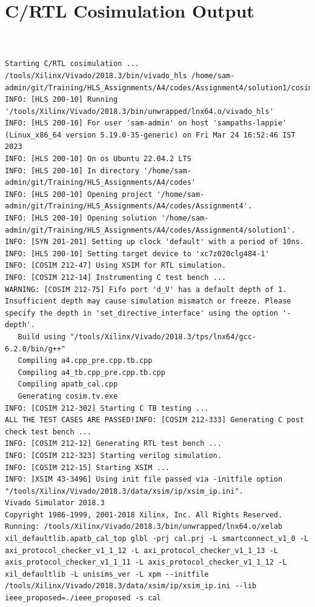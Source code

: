 \documentclass{article}
\begin{document}
\section{C/RTL Cosimulation Output}
\vspace{1cm}
\begin{lstlisting}


Starting C/RTL cosimulation ...
/tools/Xilinx/Vivado/2018.3/bin/vivado_hls /home/sam-admin/git/Training/HLS_Assignments/A4/codes/Assignment4/solution1/cosim.tcl
INFO: [HLS 200-10] Running '/tools/Xilinx/Vivado/2018.3/bin/unwrapped/lnx64.o/vivado_hls'
INFO: [HLS 200-10] For user 'sam-admin' on host 'sampaths-lappie' (Linux_x86_64 version 5.19.0-35-generic) on Fri Mar 24 16:52:46 IST 2023
INFO: [HLS 200-10] On os Ubuntu 22.04.2 LTS
INFO: [HLS 200-10] In directory '/home/sam-admin/git/Training/HLS_Assignments/A4/codes'
INFO: [HLS 200-10] Opening project '/home/sam-admin/git/Training/HLS_Assignments/A4/codes/Assignment4'.
INFO: [HLS 200-10] Opening solution '/home/sam-admin/git/Training/HLS_Assignments/A4/codes/Assignment4/solution1'.
INFO: [SYN 201-201] Setting up clock 'default' with a period of 10ns.
INFO: [HLS 200-10] Setting target device to 'xc7z020clg484-1'
INFO: [COSIM 212-47] Using XSIM for RTL simulation.
INFO: [COSIM 212-14] Instrumenting C test bench ...
WARNING: [COSIM 212-75] Fifo port 'd_V' has a default depth of 1. Insufficient depth may cause simulation mismatch or freeze. Please specify the depth in 'set_directive_interface' using the option '-depth'.
   Build using "/tools/Xilinx/Vivado/2018.3/tps/lnx64/gcc-6.2.0/bin/g++"
   Compiling a4.cpp_pre.cpp.tb.cpp
   Compiling a4_tb.cpp_pre.cpp.tb.cpp
   Compiling apatb_cal.cpp
   Generating cosim.tv.exe
INFO: [COSIM 212-302] Starting C TB testing ... 
ALL THE TEST CASES ARE PASSED!INFO: [COSIM 212-333] Generating C post check test bench ...
INFO: [COSIM 212-12] Generating RTL test bench ...
INFO: [COSIM 212-323] Starting verilog simulation. 
INFO: [COSIM 212-15] Starting XSIM ...
INFO: [XSIM 43-3496] Using init file passed via -initfile option "/tools/Xilinx/Vivado/2018.3/data/xsim/ip/xsim_ip.ini".
Vivado Simulator 2018.3
Copyright 1986-1999, 2001-2018 Xilinx, Inc. All Rights Reserved.
Running: /tools/Xilinx/Vivado/2018.3/bin/unwrapped/lnx64.o/xelab xil_defaultlib.apatb_cal_top glbl -prj cal.prj -L smartconnect_v1_0 -L axi_protocol_checker_v1_1_12 -L axi_protocol_checker_v1_1_13 -L axis_protocol_checker_v1_1_11 -L axis_protocol_checker_v1_1_12 -L xil_defaultlib -L unisims_ver -L xpm --initfile /tools/Xilinx/Vivado/2018.3/data/xsim/ip/xsim_ip.ini --lib ieee_proposed=./ieee_proposed -s cal 

\end{lstlisting}
\end{document}
